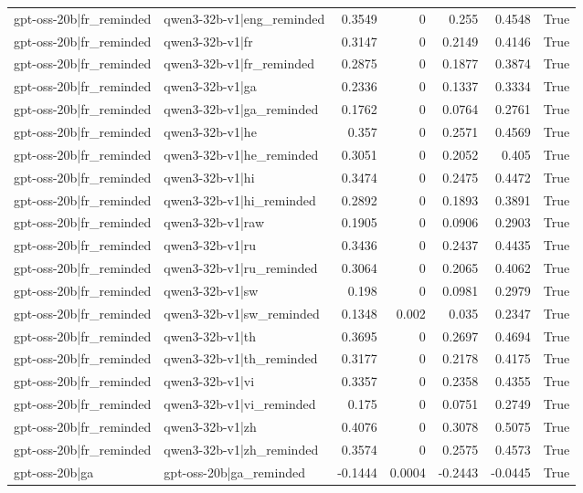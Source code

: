 \begin{table}
\begin{tabular}{l l r r r r l}
gpt-oss-20b|fr_reminded & qwen3-32b-v1|eng_reminded & 0.3549 & 0 & 0.255 & 0.4548 & True \\
gpt-oss-20b|fr_reminded & qwen3-32b-v1|fr & 0.3147 & 0 & 0.2149 & 0.4146 & True \\
gpt-oss-20b|fr_reminded & qwen3-32b-v1|fr_reminded & 0.2875 & 0 & 0.1877 & 0.3874 & True \\
gpt-oss-20b|fr_reminded & qwen3-32b-v1|ga & 0.2336 & 0 & 0.1337 & 0.3334 & True \\
gpt-oss-20b|fr_reminded & qwen3-32b-v1|ga_reminded & 0.1762 & 0 & 0.0764 & 0.2761 & True \\
gpt-oss-20b|fr_reminded & qwen3-32b-v1|he & 0.357 & 0 & 0.2571 & 0.4569 & True \\
gpt-oss-20b|fr_reminded & qwen3-32b-v1|he_reminded & 0.3051 & 0 & 0.2052 & 0.405 & True \\
gpt-oss-20b|fr_reminded & qwen3-32b-v1|hi & 0.3474 & 0 & 0.2475 & 0.4472 & True \\
gpt-oss-20b|fr_reminded & qwen3-32b-v1|hi_reminded & 0.2892 & 0 & 0.1893 & 0.3891 & True \\
gpt-oss-20b|fr_reminded & qwen3-32b-v1|raw & 0.1905 & 0 & 0.0906 & 0.2903 & True \\
gpt-oss-20b|fr_reminded & qwen3-32b-v1|ru & 0.3436 & 0 & 0.2437 & 0.4435 & True \\
gpt-oss-20b|fr_reminded & qwen3-32b-v1|ru_reminded & 0.3064 & 0 & 0.2065 & 0.4062 & True \\
gpt-oss-20b|fr_reminded & qwen3-32b-v1|sw & 0.198 & 0 & 0.0981 & 0.2979 & True \\
gpt-oss-20b|fr_reminded & qwen3-32b-v1|sw_reminded & 0.1348 & 0.002 & 0.035 & 0.2347 & True \\
gpt-oss-20b|fr_reminded & qwen3-32b-v1|th & 0.3695 & 0 & 0.2697 & 0.4694 & True \\
gpt-oss-20b|fr_reminded & qwen3-32b-v1|th_reminded & 0.3177 & 0 & 0.2178 & 0.4175 & True \\
gpt-oss-20b|fr_reminded & qwen3-32b-v1|vi & 0.3357 & 0 & 0.2358 & 0.4355 & True \\
gpt-oss-20b|fr_reminded & qwen3-32b-v1|vi_reminded & 0.175 & 0 & 0.0751 & 0.2749 & True \\
gpt-oss-20b|fr_reminded & qwen3-32b-v1|zh & 0.4076 & 0 & 0.3078 & 0.5075 & True \\
gpt-oss-20b|fr_reminded & qwen3-32b-v1|zh_reminded & 0.3574 & 0 & 0.2575 & 0.4573 & True \\
gpt-oss-20b|ga & gpt-oss-20b|ga_reminded & -0.1444 & 0.0004 & -0.2443 & -0.0445 & True \\

\end{tabular}
\end{table}
